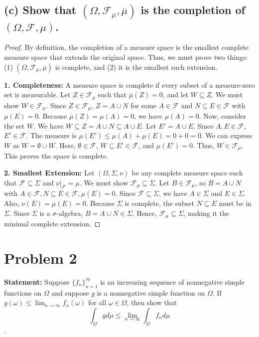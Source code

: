 \documentclass[12pt]{article}
\begin{document}
\subsection*{(c) Show that $(\Omega, \mathcal{F}_{\mu}, \overline{\mu})$ is the completion of $(\Omega, \mathcal{F}, \mu)$.}

\begin{proof}
By definition, the completion of a measure space is the smallest complete measure space that extends the original space. Thus, we must prove two things: (1) $(\Omega, \mathcal{F}_{\mu}, \overline{\mu})$ is complete, and (2) it is the smallest such extension.

\textbf{1. Completeness:} A measure space is complete if every subset of a measure-zero set is measurable. Let $Z \in \mathcal{F}_{\mu}$ such that $\overline{\mu}(Z) = 0$, and let $W \subseteq Z$. We must show $W \in \mathcal{F}_{\mu}$.
Since $Z \in \mathcal{F}_{\mu}$, $Z = A \cup N$ for some $A \in \mathcal{F}$ and $N \subseteq E \in \mathcal{F}$ with $\mu(E) = 0$. Because $\overline{\mu}(Z) = \mu(A) = 0$, we have $\mu(A) = 0$.
Now, consider the set $W$. We have $W \subseteq Z = A \cup N \subseteq A \cup E$. 
Let $E' = A \cup E$. Since $A, E \in \mathcal{F}$, $E' \in \mathcal{F}$. The measure is $\mu(E') \le \mu(A) + \mu(E) = 0 + 0 = 0$.
We can express $W$ as $W = \emptyset \cup W$. Here, $\emptyset \in \mathcal{F}$, $W \subseteq E' \in \mathcal{F}$, and $\mu(E') = 0$. Thus, $W \in \mathcal{F}_{\mu}$. This proves the space is complete.

\textbf{2. Smallest Extension:} Let $(\Omega, \Sigma, \nu)$ be any complete measure space such that $\mathcal{F} \subseteq \Sigma$ and $\nu|_{\mathcal{F}} = \mu$. We must show $\mathcal{F}_{\mu} \subseteq \Sigma$.
Let $B \in \mathcal{F}_{\mu}$, so $B = A \cup N$ with $A \in \mathcal{F}, N \subseteq E \in \mathcal{F}, \mu(E) = 0$. Since $\mathcal{F} \subseteq \Sigma$, we have $A \in \Sigma$ and $E \in \Sigma$. Also, $\nu(E) = \mu(E) = 0$. Because $\Sigma$ is complete, the subset $N \subseteq E$ must be in $\Sigma$. Since $\Sigma$ is a $\sigma$-algebra, $B = A \cup N \in \Sigma$. Hence, $\mathcal{F}_{\mu} \subseteq \Sigma$, making it the minimal complete extension.
\end{proof}

\section*{Problem 2}

\textbf{Statement:} Suppose $\{f_{n}\}_{n=1}^{\infty}$ is an increasing sequence of nonnegative simple functions on $\Omega$ and suppose $g$ is a nonnegative simple function on $\Omega$. If $g(\omega) \le \lim_{n\rightarrow\infty} f_{n}(\omega)$ for all $\omega \in \Omega$, then show that
$$ \int_{\Omega} g d\mu \le \lim_{n\rightarrow\infty} \int_{\Omega} f_{n} d\mu $$.
\end{document}

